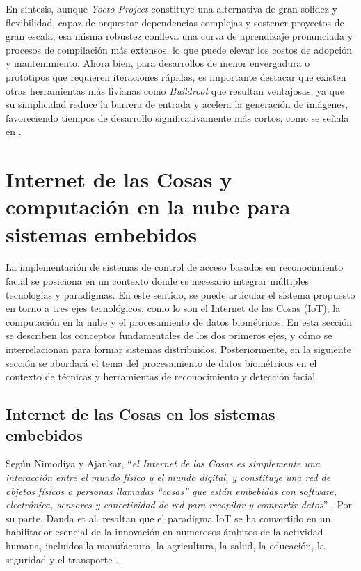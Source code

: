 En síntesis, aunque \textit{Yocto Project} constituye una alternativa de gran solidez y flexibilidad, capaz de orquestar dependencias complejas y sostener proyectos de gran escala, esa misma robustez conlleva una curva de aprendizaje pronunciada y procesos de compilación más extensos, lo que puede elevar los costos de adopción y mantenimiento. Ahora bien, para desarrollos de menor envergadura o prototipos que requieren iteraciones rápidas, es importante destacar que existen otras herramientas más livianas como \textit{Buildroot} que resultan ventajosas, ya que su simplicidad reduce la barrera de entrada y acelera la generación de imágenes, favoreciendo tiempos de desarrollo significativamente más cortos, como se señala en \cite{pera_2022}.

\section{Internet de las Cosas y computación en la nube para sistemas embebidos}
\label{sec:iot_cloud}
La implementación de sistemas de control de acceso basados en reconocimiento facial se posiciona en un contexto donde es necesario integrar múltiples tecnologías y paradigmas. En este sentido, se puede articular el sistema propuesto en torno a tres ejes tecnológicos, como lo son el Internet de las Cosas (IoT), la computación en la nube y el procesamiento de datos biométricos. En esta sección se describen los conceptos fundamentales de los dos primeros ejes, y cómo se interrelacionan para formar sistemas distribuidos. Posteriormente, en la siguiente sección se abordará el tema del procesamiento de datos biométricos en el contexto de técnicas y herramientas de reconocimiento y detección facial.

\subsection{Internet de las Cosas en los sistemas embebidos}
Según Nimodiya y Ajankar, ``\textit{el Internet de las Cosas es simplemente una interacción entre el mundo físico y el mundo digital, y constituye una red de objetos físicos o personas llamadas ``cosas'' que están embebidas con software, electrónica, sensores y conectividad de red para recopilar y compartir datos}'' \cite{nimodiya_2022_IoTreview}. Por su parte, Dauda et al. resaltan que el paradigma IoT se ha convertido en un habilitador esencial de la innovación en numerosos ámbitos de la actividad humana, incluidos la manufactura, la agricultura, la salud, la educación, la seguridad y el transporte \cite{dauda_survey_2024}. 

